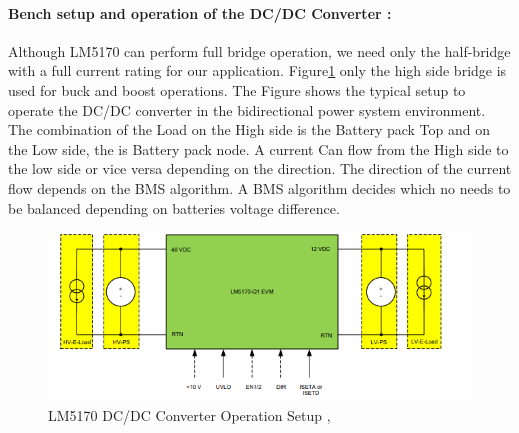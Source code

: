 \paragraph{Bench setup and operation of the DC/DC Converter :}
Although LM5170 can perform full bridge operation, we need only the half-bridge with a full current rating for our application. Figure\ref{fig:LM5170_DC_DC_Converter_Operation_Setup} only the high side bridge is used for buck and boost operations. The Figure shows the typical setup to operate the DC/DC converter in the bidirectional power system environment. The combination of the Load on the High side is the Battery pack Top and on the Low side, the is Battery pack node.  A current Can flow from the High side to the low side or vice versa depending on the direction. The direction of the current flow depends on the BMS algorithm. A BMS algorithm decides which no needs to be balanced depending on batteries voltage difference. 
\begin{figure}[h]
	\centering
	\includegraphics[width=1\textwidth]{Chap04/Figures/DC_DC_Converter_bench_setup.PNG}
	\caption{LM5170 DC/DC Converter Operation Setup \cite{TI_LM5170_BatteryTesting_Solution},\cite{TI_LM5170_EVM_User_Guide} }
	\label{fig:LM5170_DC_DC_Converter_Operation_Setup}
\end{figure}


